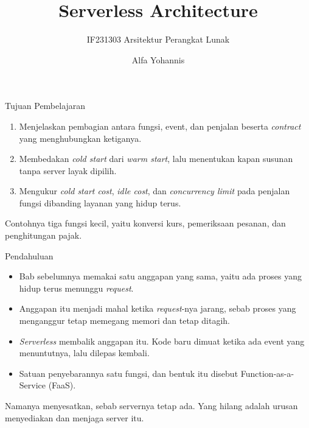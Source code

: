 \documentclass[aspectratio=169, table, 12pt]{beamer}
\title{\Huge{Serverless Architecture}}
\subtitle{IF231303 Arsitektur Perangkat Lunak}
\author{Alfa Yohannis}
\begin{document}
\frame{\titlepage}

\begin{frame}{{\Large Tujuan Pembelajaran}}
  \vspace{10pt}
  \begin{enumerate}
    \item Menjelaskan pembagian antara fungsi, event, dan penjalan beserta
          \textit{contract} yang menghubungkan ketiganya.
    \item Membedakan \textit{cold start} dari \textit{warm start}, lalu
          menentukan kapan susunan tanpa server layak dipilih.
    \item Mengukur \textit{cold start cost}, \textit{idle cost}, dan
          \textit{concurrency limit} pada penjalan fungsi dibanding layanan
          yang hidup terus.
  \end{enumerate}

  \vspace{10pt}
  {\small Contohnya tiga fungsi kecil, yaitu konversi kurs, pemeriksaan
  pesanan, dan penghitungan pajak.}
\end{frame}

\begin{frame}{{\Large Pendahuluan}}
  \vspace{10pt}
  \begin{itemize}\small
    \item Bab sebelumnya memakai satu anggapan yang sama, yaitu ada proses yang
          hidup terus menunggu \textit{request}.
    \item Anggapan itu menjadi mahal ketika \textit{request}-nya jarang, sebab
          proses yang menganggur tetap memegang memori dan tetap ditagih.
    \item \textit{Serverless} membalik anggapan itu. Kode baru dimuat ketika
          ada event yang menuntutnya, lalu dilepas kembali.
    \item Satuan penyebarannya satu fungsi, dan bentuk itu disebut
          Function-as-a-Service (FaaS).
  \end{itemize}

  \vspace{8pt}
  {\small Namanya menyesatkan, sebab servernya tetap ada. Yang hilang adalah
  urusan menyediakan dan menjaga server itu.}
\end{frame}
\end{document}
